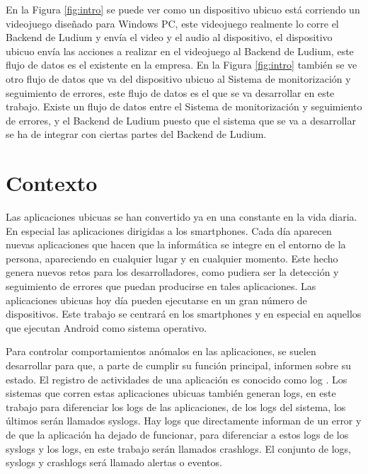 En la Figura \ref{fig:intro} se puede ver como un dispositivo ubicuo está corriendo un videojuego diseñado para Windows PC, este videojuego realmente lo corre el Backend de Ludium y envía el video y el audio al dispositivo, el dispositivo ubicuo envía las acciones a realizar en el videojuego al Backend de Ludium, este flujo de datos es el existente en la empresa. En la Figura \ref{fig:intro} también se ve otro flujo de datos que va del dispositivo ubicuo al Sistema de monitorización y seguimiento de errores, este flujo de datos es el que se va desarrollar en este trabajo. Existe un flujo de datos entre el Sistema de monitorización y seguimiento de errores, y el Backend de Ludium puesto que el sistema que se va a desarrollar se ha de integrar con ciertas partes del Backend de Ludium.

\section{Contexto}
Las aplicaciones ubicuas \cite{Tfg:ubiquitous} se han convertido ya en una constante en la vida diaria. En especial las aplicaciones dirigidas a los smartphones. Cada día aparecen nuevas aplicaciones que hacen que la informática se integre en el entorno de la persona, apareciendo en cualquier lugar y en cualquier momento. Este hecho genera nuevos retos para los desarrolladores, como pudiera ser la detección y seguimiento de errores que puedan producirse en tales aplicaciones. Las aplicaciones ubicuas hoy día pueden ejecutarse en un gran número de dispositivos. Este trabajo se centrará en los smartphones y en especial en aquellos que ejecutan Android como sistema operativo.

Para controlar comportamientos anómalos en las aplicaciones, se suelen desarrollar para que, a parte de cumplir su función principal, informen sobre su estado. El registro de actividades de una aplicación es conocido como log \cite{Tfg:thelog}. Los sistemas que corren estas aplicaciones ubicuas también generan logs, en este trabajo para diferenciar los logs de las aplicaciones, de los logs del sistema, los últimos serán llamados syslogs. Hay logs que directamente informan de un error y de que la aplicación ha dejado de funcionar, para diferenciar a estos logs de los syslogs y los logs, en este trabajo serán llamados crashlogs. El conjunto de logs, syslogs y crashlogs será llamado alertas o eventos.

